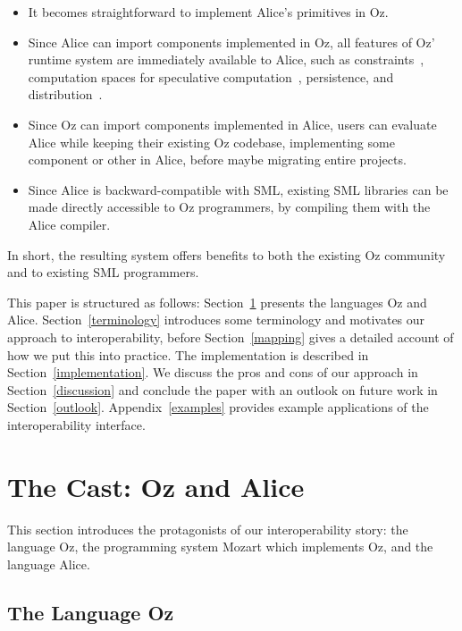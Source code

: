 \documentclass{entcs}
\begin{document}
\begin{itemize}
\item It becomes straightforward to implement Alice's primitives in Oz.
\item Since Alice can import components implemented in Oz, all features
  of Oz' runtime system are immediately available to Alice, such as
  constraints~\cite{ConstraintPropagation}, computation spaces for
  speculative computation~\cite{ConstraintServices}, persistence, and
  distribution~\cite{Distribution}.
\item Since Oz can import components implemented in Alice, users can
  evaluate Alice while keeping their existing Oz codebase, implementing
  some component or other in Alice, before maybe migrating entire projects.
\item Since Alice is backward-compatible with SML, existing SML libraries
  can be made directly accessible to Oz programmers, by compiling them with
  the Alice compiler.
\end{itemize}

\noindent In short, the resulting system offers benefits to both the
existing Oz community and to existing SML programmers.

This paper is structured as follows: Section~\ref{cast} presents the
languages Oz and Alice.  Section~\ref{terminology} introduces some
terminology and motivates our approach to interoperability, before
Section~\ref{mapping} gives a detailed account of how we put this into
practice.  The implementation is described in Section~\ref{implementation}.
We discuss the pros and cons of our approach in Section~\ref{discussion}
and conclude the paper with an outlook on future work in Section~\ref{outlook}.
Appendix~\ref{examples} provides example applications of the interoperability
interface.


\section{The Cast: Oz and Alice}\label{cast}

This section introduces the protagonists of our interoperability story:
the language Oz, the programming system Mozart which implements Oz, and
the language Alice.

\subsection{The Language Oz}
\end{document}
